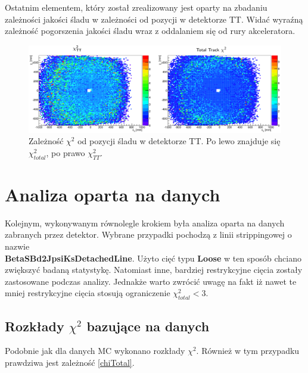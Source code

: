 Ostatnim elementem, który został zrealizowany jest oparty na zbadaniu zależności jakości śladu w zależności od pozycji w detektorze TT. Widać wyraźną zależność pogorszenia jakości śladu wraz z oddalaniem się od rury akceleratora. 

 \begin{figure}[H]
 \centering
 \includegraphics[scale=0.35]{rozdzial6/Chi2_vs_position_TT.png}
 \caption{Zależność $\chi^2$ od pozycji śladu w detektorze TT. Po lewo znajduje się $\chi^2_{total}$, po prawo $\chi^2_{TT}$. }
 \label{rys:BJPsi}
\end{figure}

\section{Analiza oparta na danych}
Kolejnym, wykonywanym równolegle krokiem była analiza oparta na danych zabranych przez detektor. Wybrane przypadki pochodzą z linii strippingowej o nazwie \\ \textbf{BetaSBd2JpsiKsDetachedLine}. Użyto cięć typu \textbf{Loose} w ten sposób chciano zwiększyć badaną statystykę. Natomiast inne, bardziej restrykcyjne cięcia zostały zastosowane podczas analizy. Jednakże warto zwrócić uwagę na fakt iż nawet te mniej restrykcyjne cięcia stosują ograniczenie $\chi^2_{total}<3$. 

\subsection{Rozkłady $\chi^2$ bazujące na danych}
Podobnie jak dla danych MC wykonano rozkłady $\chi^2$. Również w tym przypadku prawdziwa jest zależność \ref{chiTotal}. 

